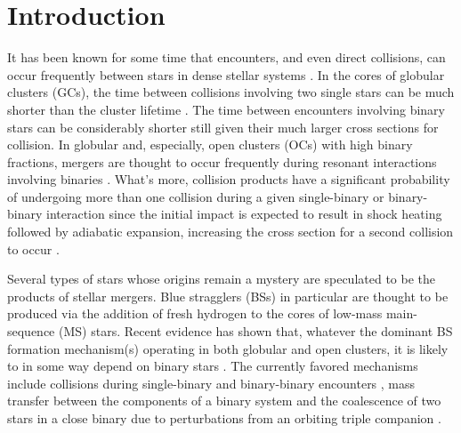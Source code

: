\section{Introduction} \label{intro2}

It has been known for some time that encounters, and even direct
collisions, can occur frequently between stars in dense stellar systems
\citep[e.g.]{hills76, hut83a, leonard89}.  In the cores of globular
clusters (GCs), the time between collisions
involving two single stars can 
be much shorter than the cluster lifetime \citep{leonard89}.
The time between encounters involving binary stars can be
considerably shorter still given their much larger cross sections for
collision.  In globular and, especially, open clusters (OCs) with high 
binary fractions, mergers are thought to occur frequently during
resonant interactions involving binaries \citep[e.g.][]{leonard92}.
What's more, collision products have a significant probability of
undergoing more than one 
collision during a given single-binary or binary-binary interaction
since the initial impact is expected to result in shock heating
followed by adiabatic expansion, increasing the cross section for a
second collision to occur \citep[e.g.][]{fregeau04}.    

Several types of stars whose origins remain a mystery are speculated
to be the products of stellar mergers.  Blue stragglers (BSs) in
particular are thought to be produced via the addition of fresh
hydrogen to the cores of low-mass main-sequence (MS) stars.  Recent
evidence has shown that, whatever the dominant BS formation 
mechanism(s) operating in both globular and open clusters, it
is likely to in some way depend on binary stars \citep{knigge09,
  mathieu09}.  The currently favored mechanisms include collisions
during single-binary and binary-binary encounters
\citep[e.g.][]{leonard89}, mass transfer 
between the components of a binary system \citep[e.g.][]{chen08a,
  chen08b} and the coalescence of two 
stars in a close binary due to perturbations from an orbiting
triple companion \citep[e.g.][]{eggleton06, perets09}.

